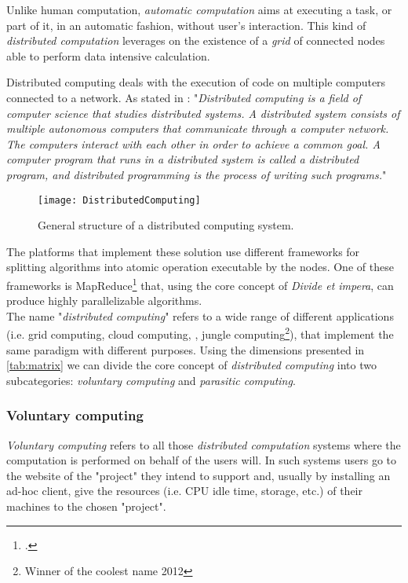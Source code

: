 
Unlike human computation, \emph{automatic computation} aims at executing a task, or
part of it, in an automatic fashion, without user's interaction. This kind of
\emph{distributed computation} leverages on the existence of a \emph{grid} of
connected nodes able to perform data intensive calculation.


Distributed computing deals with the execution of code on multiple computers
connected to a network. As stated in \cite{andrewsfoundations}: "\emph{Distributed
computing is a field of computer science that studies distributed systems. A
distributed system consists of multiple autonomous computers that communicate
through a computer network. The computers interact with each other in order to
achieve a common goal. A computer program that runs in a distributed system is
called a distributed program, and distributed programming is the process of
writing such programs.}"
\begin{figure}[htb]
    \centering
    \texttt{[image: DistributedComputing]}
    \caption{General structure of a distributed computing system.}
    \label{fig:distributed-computing}
\end{figure}

The platforms that implement these solution use different frameworks for splitting
algorithms into atomic operation executable by the nodes. One of these frameworks
is MapReduce\footcite{dean2008mapreduce} that, using the core concept of
\emph{Divide et impera}, can produce highly parallelizable algorithms.\\

The name "\emph{distributed computing}" refers to a wide range of different
applications (i.e. grid computing, cloud computing,
, jungle computing\footnote{Winner of the
coolest name 2012}), that implement the same paradigm with different purposes.
Using the dimensions presented in \autoref{tab:matrix} we can divide the
core concept of \emph{distributed computing} into two subcategories: \emph{voluntary
computing} and \emph{parasitic computing}.


\subsubsection{Voluntary computing}
\label{sec:bg:crowd:auto:voluntary}
\emph{Voluntary computing} refers to all those \emph{distributed computation}
systems where the computation is performed on behalf of the users will. In such
systems users go to the website of the "project" they intend to support and, usually
by installing an ad-hoc client, give the resources (i.e. CPU idle time, storage,
etc.) of their machines to the chosen "project".\\

